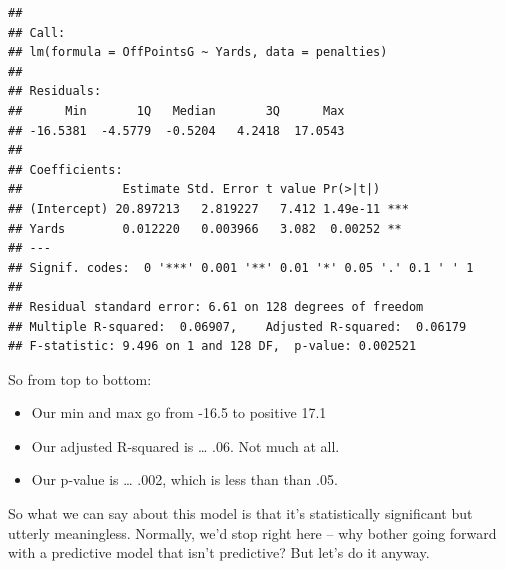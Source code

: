 \documentclass[]{book}
\newenvironment{Shaded}{\begin{snugshade}}{\end{snugshade}}
\newcommand{\KeywordTok}[1]{\textcolor[rgb]{0.13,0.29,0.53}{\textbf{#1}}}
\newcommand{\StringTok}[1]{\textcolor[rgb]{0.31,0.60,0.02}{#1}}
\newcommand{\OperatorTok}[1]{\textcolor[rgb]{0.81,0.36,0.00}{\textbf{#1}}}
\newcommand{\NormalTok}[1]{#1}
\providecommand{\tightlist}{%
  \setlength{\itemsep}{0pt}\setlength{\parskip}{0pt}}
\begin{document}
\begin{verbatim}
## 
## Call:
## lm(formula = OffPointsG ~ Yards, data = penalties)
## 
## Residuals:
##      Min       1Q   Median       3Q      Max 
## -16.5381  -4.5779  -0.5204   4.2418  17.0543 
## 
## Coefficients:
##              Estimate Std. Error t value Pr(>|t|)    
## (Intercept) 20.897213   2.819227   7.412 1.49e-11 ***
## Yards        0.012220   0.003966   3.082  0.00252 ** 
## ---
## Signif. codes:  0 '***' 0.001 '**' 0.01 '*' 0.05 '.' 0.1 ' ' 1
## 
## Residual standard error: 6.61 on 128 degrees of freedom
## Multiple R-squared:  0.06907,    Adjusted R-squared:  0.06179 
## F-statistic: 9.496 on 1 and 128 DF,  p-value: 0.002521
\end{verbatim}

So from top to bottom:

\begin{itemize}
\tightlist
\item
  Our min and max go from -16.5 to positive 17.1
\item
  Our adjusted R-squared is \ldots{} .06. Not much at all.
\item
  Our p-value is \ldots{} .002, which is less than than .05.
\end{itemize}

So what we can say about this model is that it's statistically
significant but utterly meaningless. Normally, we'd stop right here --
why bother going forward with a predictive model that isn't predictive?
But let's do it anyway.

\begin{Shaded}
\end{Shaded}

\begin{Shaded}
\end{Shaded}
\end{document}
